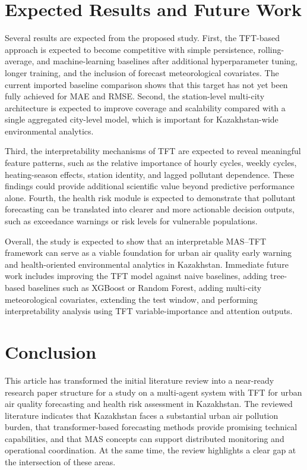 \documentclass[pdflatex,sn-mathphys-num]{sn-jnl}
\begin{document}
\section{Expected Results and Future Work}\label{sec:expected}

Several results are expected from the proposed study. First, the TFT-based approach is expected to become competitive with simple persistence, rolling-average, and machine-learning baselines after additional hyperparameter tuning, longer training, and the inclusion of forecast meteorological covariates. The current imported baseline comparison shows that this target has not yet been fully achieved for MAE and RMSE. Second, the station-level multi-city architecture is expected to improve coverage and scalability compared with a single aggregated city-level model, which is important for Kazakhstan-wide environmental analytics.

Third, the interpretability mechanisms of TFT are expected to reveal meaningful feature patterns, such as the relative importance of hourly cycles, weekly cycles, heating-season effects, station identity, and lagged pollutant dependence. These findings could provide additional scientific value beyond predictive performance alone. Fourth, the health risk module is expected to demonstrate that pollutant forecasting can be translated into clearer and more actionable decision outputs, such as exceedance warnings or risk levels for vulnerable populations.

Overall, the study is expected to show that an interpretable MAS--TFT framework can serve as a viable foundation for urban air quality early warning and health-oriented environmental analytics in Kazakhstan. Immediate future work includes improving the TFT model against naive baselines, adding tree-based baselines such as XGBoost or Random Forest, adding multi-city meteorological covariates, extending the test window, and performing interpretability analysis using TFT variable-importance and attention outputs.

\section{Conclusion}\label{sec:conclusion}

This article has transformed the initial literature review into a near-ready research paper structure for a study on a multi-agent system with TFT for urban air quality forecasting and health risk assessment in Kazakhstan. The reviewed literature indicates that Kazakhstan faces a substantial urban air pollution burden, that transformer-based forecasting methods provide promising technical capabilities, and that MAS concepts can support distributed monitoring and operational coordination. At the same time, the review highlights a clear gap at the intersection of these areas.
\end{document}
